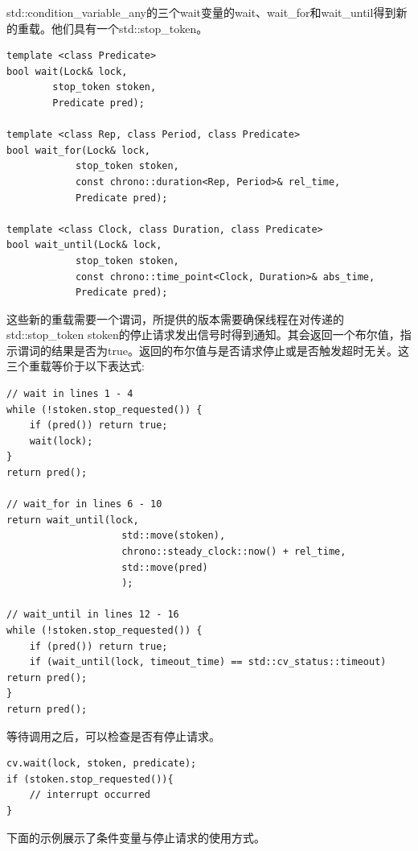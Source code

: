 std::condition\_variable\_any的三个wait变量的wait、wait\_for和wait\_until得到新的重载。他们具有一个std::stop\_token。

\begin{lstlisting}[style=styleCXX]
template <class Predicate>
bool wait(Lock& lock,
		stop_token stoken,
		Predicate pred);

template <class Rep, class Period, class Predicate>
bool wait_for(Lock& lock,
			stop_token stoken,
			const chrono::duration<Rep, Period>& rel_time,
			Predicate pred);

template <class Clock, class Duration, class Predicate>
bool wait_until(Lock& lock,
			stop_token stoken,
			const chrono::time_point<Clock, Duration>& abs_time,
			Predicate pred);
\end{lstlisting}

这些新的重载需要一个谓词，所提供的版本需要确保线程在对传递的std::stop\_token stoken的停止请求发出信号时得到通知。其会返回一个布尔值，指示谓词的结果是否为true。返回的布尔值与是否请求停止或是否触发超时无关。这三个重载等价于以下表达式:

\begin{lstlisting}[style=styleCXX]
// wait in lines 1 - 4
while (!stoken.stop_requested()) {
	if (pred()) return true;
	wait(lock);
}
return pred();

// wait_for in lines 6 - 10
return wait_until(lock,
					std::move(stoken),
					chrono::steady_clock::now() + rel_time,
					std::move(pred)
					);

// wait_until in lines 12 - 16
while (!stoken.stop_requested()) {
	if (pred()) return true;
	if (wait_until(lock, timeout_time) == std::cv_status::timeout) return pred();
}
return pred();
\end{lstlisting}

等待调用之后，可以检查是否有停止请求。

\begin{lstlisting}[style=styleCXX]
cv.wait(lock, stoken, predicate);
if (stoken.stop_requested()){
	// interrupt occurred
}
\end{lstlisting}

下面的示例展示了条件变量与停止请求的使用方式。

